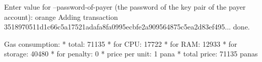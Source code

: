 \begin{shellbox}\begin{ttlst}
Enter value for --password-of-payer (the password of the key pair of the payer account): orange
Adding transaction 3518970511d1c66c5a17521adafa8fa0995ecbfe2a909564875c5ea2d83ef495... done.

Gas consumption:
 * total: 71135
   * for CPU: 17722
   * for RAM: 12933
   * for storage: 40480
   * for penalty: 0
 * price per unit: 1 pana
 * total price: 71135 panas
\end{ttlst}\end{shellbox}
